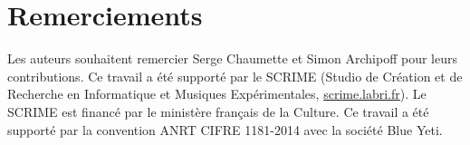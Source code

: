 \documentclass[10pt]{article}
\begin{document}


\section{Remerciements}
Les auteurs souhaitent remercier Serge Chaumette et Simon Archipoff pour leurs contributions.
Ce travail a été supporté par le SCRIME (Studio de Cr\'eation et de Recherche en Informatique et Musiques Exp\'erimentales, \url{scrime.labri.fr}). Le SCRIME est financé par le ministère français de la Culture.
Ce travail a été supporté par la convention ANRT CIFRE 1181-2014 avec la société Blue Yeti. 
\printbibliography 
\end{document}
